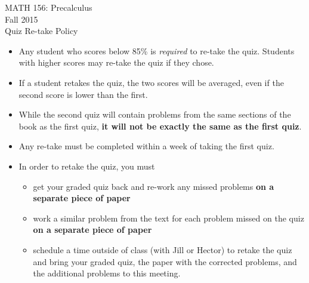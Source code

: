 \documentclass[11pt]{article}
\begin{document}
 

\begin{center}MATH 156: Precalculus  \\ Fall 2015 \\ Quiz Re-take Policy \end{center}

\hrulefill

\begin{itemize}
\item Any student who scores below 85\% is {\it{required}} to re-take the quiz. Students with higher scores may re-take the quiz if they chose.
\item If a student retakes the quiz, the two scores will be averaged, even if the second score is lower than the first.
\item While the second quiz will contain problems from the same sections of the book as the first quiz, {\bf{it will not be exactly the same as the first quiz}}.
\item Any re-take must be completed within a week of taking the first quiz.
\item In order to retake the quiz, you must 
\begin{itemize}
\item get your graded quiz back and re-work any missed problems {\bf{on a separate piece of paper}}
\item work a similar problem from the text for each problem missed on the quiz  {\bf{on a separate piece of paper}}
\item schedule a time outside of class (with Jill or Hector) to retake the quiz and bring your graded quiz, the paper with the corrected problems, and the additional problems to this meeting.
\end{itemize}

\end{itemize}
\end{document}

